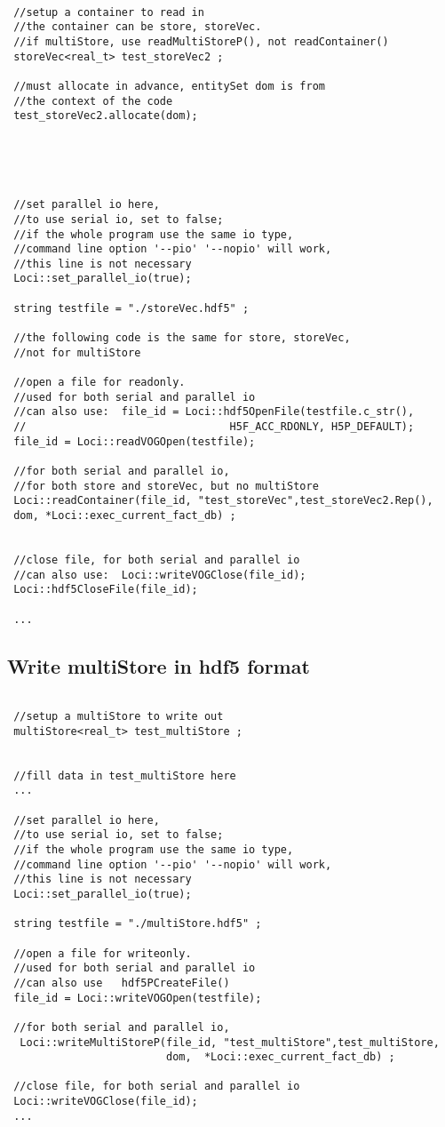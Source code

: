 \documentclass{article}
\begin{document}
\begin{lstlisting}

 //setup a container to read in 
 //the container can be store, storeVec.
 //if multiStore, use readMultiStoreP(), not readContainer() 
 storeVec<real_t> test_storeVec2 ;

 //must allocate in advance, entitySet dom is from
 //the context of the code
 test_storeVec2.allocate(dom);
 
     
   


 //set parallel io here,
 //to use serial io, set to false; 
 //if the whole program use the same io type, 
 //command line option '--pio' '--nopio' will work,
 //this line is not necessary  
 Loci::set_parallel_io(true);
 
 string testfile = "./storeVec.hdf5" ;

 //the following code is the same for store, storeVec,
 //not for multiStore

 //open a file for readonly. 
 //used for both serial and parallel io
 //can also use:  file_id = Loci::hdf5OpenFile(testfile.c_str(),
 //                                H5F_ACC_RDONLY, H5P_DEFAULT);  
 file_id = Loci::readVOGOpen(testfile);

 //for both serial and parallel io, 
 //for both store and storeVec, but no multiStore
 Loci::readContainer(file_id, "test_storeVec",test_storeVec2.Rep(),
 dom, *Loci::exec_current_fact_db) ;


 //close file, for both serial and parallel io
 //can also use:  Loci::writeVOGClose(file_id);
 Loci::hdf5CloseFile(file_id); 
 
 ...

\end{lstlisting}


\subsection {Write multiStore in hdf5 format }

\begin{lstlisting}

 //setup a multiStore to write out 
 multiStore<real_t> test_multiStore ;


 //fill data in test_multiStore here
 ...

 //set parallel io here,
 //to use serial io, set to false; 
 //if the whole program use the same io type, 
 //command line option '--pio' '--nopio' will work,
 //this line is not necessary  
 Loci::set_parallel_io(true);
 
 string testfile = "./multiStore.hdf5" ;

 //open a file for writeonly. 
 //used for both serial and parallel io
 //can also use   hdf5PCreateFile() 
 file_id = Loci::writeVOGOpen(testfile);

 //for both serial and parallel io, 
  Loci::writeMultiStoreP(file_id, "test_multiStore",test_multiStore,
                         dom,  *Loci::exec_current_fact_db) ;

 //close file, for both serial and parallel io
 Loci::writeVOGClose(file_id);
 ...

\end{lstlisting}
\end{document}

